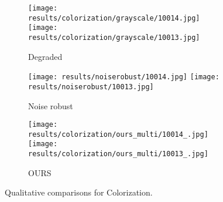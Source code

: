 



\begin{figure}[t!]
    \centering

      \begin{subfigure}[t]{0.23\linewidth}
      \captionsetup{justification=centering, labelformat=empty, font=scriptsize}
    \texttt{[image: results/colorization/grayscale/10014.jpg]}
    \texttt{[image: results/colorization/grayscale/10013.jpg]}
      \caption{Degraded}
    \end{subfigure}
    \begin{subfigure}[t]{0.23\linewidth}
      \captionsetup{justification=centering, labelformat=empty, font=scriptsize}
    \texttt{[image: results/noiserobust/10014.jpg]}
    \texttt{[image: results/noiserobust/10013.jpg]}
      \caption{Noise robust}
    \end{subfigure}
    \begin{subfigure}[t]{0.23\linewidth}
      \captionsetup{justification=centering, labelformat=empty, font=scriptsize}
    \texttt{[image: results/colorization/ours\_multi/10014\_.jpg]}
    \texttt{[image: results/colorization/ours\_multi/10013\_.jpg]}
      \caption{OURS}
    \end{subfigure}
    \vspace{-3mm}    
    \caption{Qualitative comparisons for Colorization. }
    \label{fig:facenoiserobust}
    \vspace{-5mm}
  \end{figure}